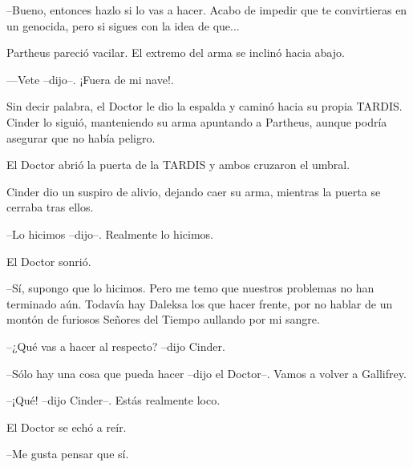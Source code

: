 --Bueno, entonces hazlo si lo vas a hacer. Acabo de impedir que te convirtieras en un genocida, pero si sigues con la idea de que...



Partheus pareció vacilar. El extremo del arma se inclinó hacia abajo. 



---Vete --dijo--. ¡Fuera de mi nave!.



Sin decir palabra, el Doctor le dio la espalda y caminó hacia su propia TARDIS. Cinder lo siguió, manteniendo su arma apuntando a Partheus, aunque podría asegurar que no había peligro.

El Doctor abrió la puerta de la TARDIS y ambos cruzaron el umbral.

Cinder dio un suspiro de alivio, dejando caer su arma, mientras la puerta se cerraba tras ellos. 



--Lo hicimos --dijo--. Realmente lo hicimos.



El Doctor sonrió. 



--Sí, supongo que lo hicimos. Pero me temo que nuestros problemas no han terminado aún. Todavía hay Daleksa los que hacer frente, por no hablar de un montón de furiosos Señores del Tiempo aullando por mi sangre.

--¿Qué vas a hacer al respecto? --dijo Cinder.

--Sólo hay una cosa que pueda hacer --dijo el Doctor--. Vamos a volver a Gallifrey.

--¡Qué! --dijo Cinder--. Estás realmente loco.



El Doctor se echó a reír. 



--Me gusta pensar que sí.



